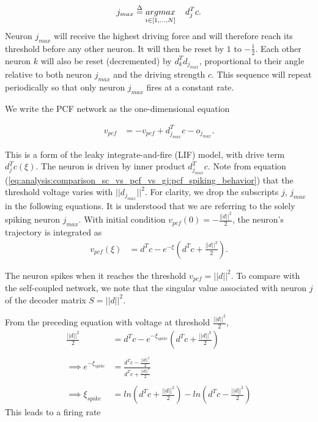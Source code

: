 \begin{align*}
	j_{max} \overset{\Delta}{=}
	 \underset{
	 	i \in 
	 	\left[
	 		1, \ldots, N
	 	\right]
	 }
	 {argmax}
	 \hspace{4mm}
	 	d_j^T c.
\end{align*}
Neuron $j_{max}$ will receive the highest driving force and will therefore reach its threshold  before any other neuron. It will then be reset by $1$ to $- \frac{1}{2}$. Each other neuron $k$ will also be reset (decremented) by $d_k^T d_{j_{max}}$, proportional to their angle relative to both neuron $j_{max}$ and the driving strength $c$. This sequence will repeat periodically so that only neuron $j_{max}$ fires at a constant rate. 

We write the PCF network as the one-dimensional equation

\begin{align*}
	v_{pcf} &= 
	- v_{pcf}
	+ d_{j_{max}}^T c 
	- o_{j_{max}}.
\end{align*}

This is a form of the leaky integrate-and-fire (LIF) model, with drive term $d_j^T c(\xi)$. The neuron is driven by inner product $d_{j_{max}}^T c$. Note from equation (\ref{eq:analysis:comparison_sc_vs_pcf_vs_gj:pcf_spiking_behavior}) that the threshold voltage varies with $||d_{j_{max}}||^2$.  For clarity, we drop the subscripts $j$, $j_{max}$ in the following equations. It is understood that we are referring to the solely spiking neuron $j_{max}$.
With initial condition $v_{pcf}(0) = - \frac{||d||^2}{2}$, the neuron's trajectory is integrated as 
\begin{align}
\label{eq:analysis:comparison_sc_vs_pcf_vs_gj:const_stim:pcf_voltage_trajectory}
	v_{pcf}(\xi)
	&= 
	d^T c - e^{-\xi} 
	\left(
		d^T c + \frac{||d||^2}{2}
	\right). 
\end{align}

The neuron spikes when it reaches the threshold $v_{pcf} = ||d||^2$. To compare with the self-coupled network, we note that the singular value associated with neuron $j$ of the decoder matrix $S = ||d||^2$.

From the preceding equation with voltage at  threshold $\frac{||d||^2}{2}$,
\begin{align*}
	\frac{||d||^2}{2}
	&= 
	d^T c - e^{-\xi_{spike}} 
	\left(
		d^T c + \frac{||d||^2}{2}
	\right)
	\\
	\\
	\implies
	e^{-\xi_{spike}}
	&= 
		\frac
	{
		d^T c - \frac{||d||^2}{2}
	}
	{
		d^T c + \frac{||d||^2}{2}
	}
	\\
	\\
	\implies
	\xi_{spike}
	&= 
	ln
	\left(
		d^T c + \frac{||d||^2}{2}
	\right)
	-
	ln
	\left(
		d^T c - \frac{||d||^2}{2}
	\right)		
\end{align*}
This leads to a firing rate 

